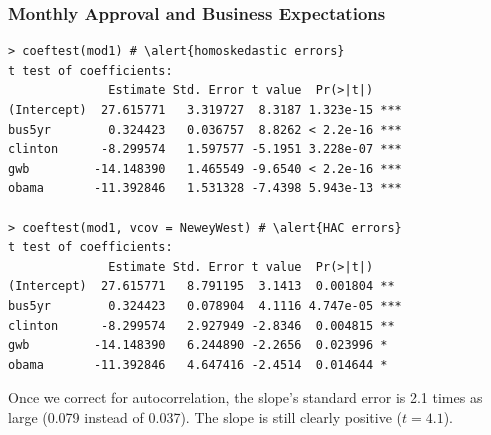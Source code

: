 \documentclass[xcolor=svgnames,9pt,english,aspectratio=169,t]{beamer}
\begin{document}


\begin{frame}[fragile]
\frametitle{Monthly Approval and Business Expectations}

\begin{Verbatim}[fontsize=\scriptsize, frame=single, label=R Code, commandchars=\\\{\}]
> coeftest(mod1) # \alert{homoskedastic errors}
t test of coefficients:
              Estimate Std. Error t value  Pr(>|t|)
(Intercept)  27.615771   3.319727  8.3187 1.323e-15 ***
bus5yr        0.324423   0.036757  8.8262 < 2.2e-16 ***
clinton      -8.299574   1.597577 -5.1951 3.228e-07 ***
gwb         -14.148390   1.465549 -9.6540 < 2.2e-16 ***
obama       -11.392846   1.531328 -7.4398 5.943e-13 ***

> coeftest(mod1, vcov = NeweyWest) # \alert{HAC errors}
t test of coefficients:
              Estimate Std. Error t value  Pr(>|t|)
(Intercept)  27.615771   8.791195  3.1413  0.001804 **
bus5yr        0.324423   0.078904  4.1116 4.747e-05 ***
clinton      -8.299574   2.927949 -2.8346  0.004815 **
gwb         -14.148390   6.244890 -2.2656  0.023996 *
obama       -11.392846   4.647416 -2.4514  0.014644 *
\end{Verbatim}
Once we correct for autocorrelation, the slope's standard error is 2.1 times as large (0.079 instead of 0.037). The slope is still clearly positive ($t = 4.1$).
\end{frame}
\end{document}
